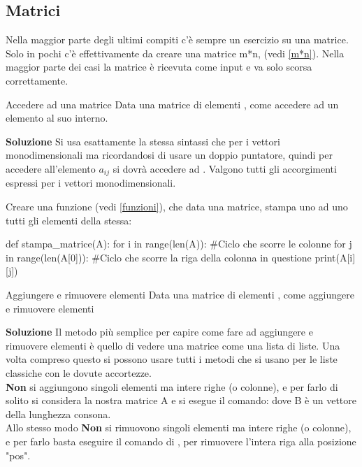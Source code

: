 \documentclass[10pt]{article}
\makeatletter
\newcommand{\<}{\langle}
\renewcommand{\>}{\rangle}
\renewenvironment{proof}[1][\proofname] {\par\pushQED{\qed}
\renewcommand*{\proofname}{Soluzione}
{\normalfont\sffamily\bfseries\topsep6\p@\@plus6\p@\relax #1\@addpunct{.} }}{\popQED\endtrivlist\@endpefalse}
\theoremstyle{mystyle}{\newtheorem*{remark}{Nota}}
\theoremstyle{mystyle}{\newtheorem*{remarks}{Note}}
\theoremstyle{mystyle}{\newtheorem*{example}{Esempio}}
\theoremstyle{mystyle}{\newtheorem*{examples}{Esempi}}
\theoremstyle{definition}{\newtheorem*{exercise}{Exercise}}
\theoremstyle{warn}
\makeatother
\begin{document}
\newpage
\subsection{Matrici}
Nella maggior parte degli ultimi compiti c'è sempre un esercizio su una matrice. Solo in pochi c'è effettivamente da creare una matrice m*n, (vedi \ref{m*n}). Nella maggior parte dei casi la matrice è ricevuta come input e va solo scorsa correttamente.

\begin{definition}{Accedere ad una matrice}{}
Data una matrice di elementi , come accedere ad un elemento al suo interno.
\end{definition}
\begin{proof}
Si usa esattamente la stessa sintassi che per i vettori monodimensionali ma ricordandosi di usare un doppio puntatore, quindi per accedere all'elemento $a_{ij}$ si dovrà accedere ad . Valgono tutti gli accorgimenti espressi per i vettori monodimensionali.
\end{proof}
\begin{example}
Creare una funzione (vedi \ref{funzioni}), che data una matrice, stampa uno ad uno tutti gli elementi della stessa:
\begin{python}
def stampa_matrice(A):
    for i in range(len(A)): #Ciclo che scorre le colonne
        for j in range(len(A[0])):  #Ciclo che scorre la riga della colonna in questione
            print(A[i][j])
\end{python}
\end{example}
\begin{definition}{Aggiungere e rimuovere elementi}{}
Data una matrice di elementi , come aggiungere e rimuovere elementi
\end{definition}
\begin{proof}
Il metodo più semplice per capire come fare ad aggiungere e rimuovere elementi è quello di vedere una matrice come una lista di liste. Una volta compreso questo si possono usare tutti i metodi che si usano per le liste classiche con le dovute accortezze.\\
\textbf{Non} si aggiungono singoli elementi ma intere righe (o colonne), e per farlo di solito si considera la nostra matrice A e si esegue il comando:  dove B è un vettore della lunghezza consona.\\
Allo stesso modo \textbf{Non} si rimuovono singoli elementi ma intere righe (o colonne), e per farlo basta eseguire il comando di , per rimuovere l'intera riga alla posizione "pos".
\end{proof}
\end{document}
